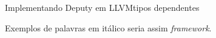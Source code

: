 \begin{englishabstract}{Implementando Deputy em LLVM}{tipos dependentes}

Exemplos de palavras em itálico seria assim {\em framework}.

\end{englishabstract}
